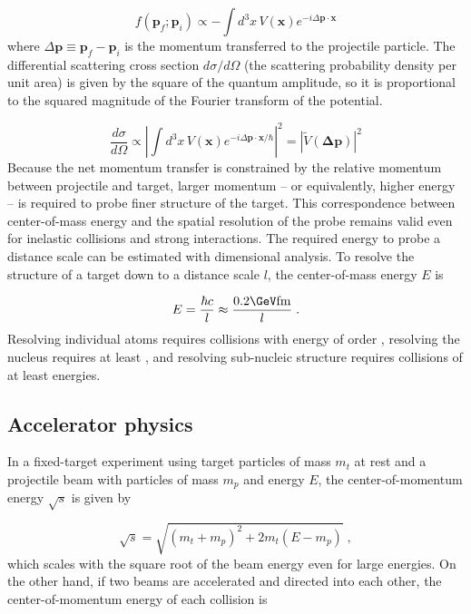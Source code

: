 \begin{equation}
  f\left(\mathbf{p}_f ; \mathbf{p}_i\right) \propto - \int d^3 x \, V(\mathbf{x}) e^{-i \Delta \mathbf{p} \cdot \mathbf{x}}
  \label{eqn:born}
\end{equation}
where $\Delta \mathbf{p} \equiv \mathbf{p}_f - \mathbf{p}_i$ is the momentum transferred to the projectile particle.
The differential scattering cross section $d\sigma/d\Omega$ (the scattering probability density per unit area) is given by the square of the quantum amplitude, so it is proportional to the squared magnitude of the Fourier transform of the potential.

\begin{equation}
  \frac{d\sigma}{d\Omega} \propto \left| \int d^3 x \, V(\mathbf{x}) e^{-i \Delta \mathbf{p} \cdot \mathbf{x} / \hbar} \right|^2 = \left| \tilde{V}(\mathbf{\Delta \mathbf{p}}) \right|^2
\end{equation}
Because the net momentum transfer is constrained by the relative momentum between projectile and target, larger momentum -- or equivalently, higher energy -- is required to probe finer structure of the target.
This correspondence between center-of-mass energy and the spatial resolution of the probe remains valid even for inelastic collisions and strong interactions.
The required energy to probe a distance scale can be estimated with dimensional analysis.
To resolve the structure of a target down to a distance scale $l$, the center-of-mass energy $E$ is

\begin{equation}
E = \frac{\hbar c}{l} \approx \frac{0.2 \GeV \fm}{l} \; .
\end{equation}
Resolving individual atoms requires collisions with energy of order \keV, resolving the nucleus requires at least \MeV, and resolving sub-nucleic structure requires collisions of at least \GeV energies.

\subsection{Accelerator physics}
In a fixed-target experiment using target particles of mass $m_t$ at rest and a projectile beam with particles of mass $m_p$ and energy $E$, the center-of-momentum energy $\sqrt{s}$ is given by

\begin{equation}
\sqrt{s} = \sqrt{(m_t+m_p)^2 + 2 m_t (E - m_p)} \; ,
\end{equation}
which scales with the square root of the beam energy even for large energies.
On the other hand, if two beams are accelerated and directed into each other, the center-of-momentum energy of each collision is

